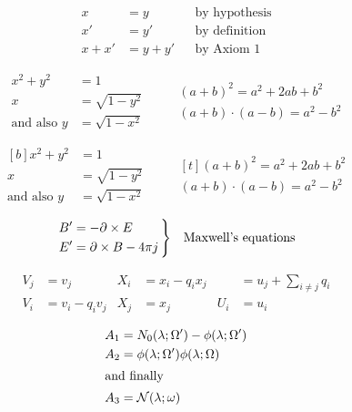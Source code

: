 \documentclass{article}
\begin{document}
\renewcommand\minalignsep{2em}  
\begin{align}  
  x      &= y      && \text{by hypothesis} \\  
      x' &= y'     && \text{by definition} \\  
  x + x' &= y + y' && \text{by Axiom 1}  
\end{align}  
  
\begin{equation}  
\begin{aligned}  
  x^2 + y^2  &= 1               \\  
  x          &= \sqrt{1-y^2}    \\  
 \text{and also }y &= \sqrt{1-x^2}  
\end{aligned}               \qquad  
\begin{gathered}  
 (a + b)^2 = a^2 + 2ab + b^2    \\  
 (a + b) \cdot (a - b) = a^2 - b^2  
\end{gathered}      \end{equation}  
  
\begin{equation}  
\begin{aligned}[b]  
  x^2 + y^2  &= 1               \\  
  x          &= \sqrt{1-y^2}    \\  
 \text{and also }y &= \sqrt{1-x^2}  
\end{aligned}               \qquad  
\begin{gathered}[t]  
 (a + b)^2 = a^2 + 2ab + b^2    \\  
 (a + b) \cdot (a - b) = a^2 - b^2  
\end{gathered}  
\end{equation}  
\newenvironment{rcase}  
    {\left.\begin{aligned}}  
    {\end{aligned}\right\rbrace}  
  
\begin{equation*}  
  \begin{rcase}  
    B' &= -\partial\times E          \\  
    E' &=  \partial\times B - 4\pi j \,  
  \end{rcase}  
  \quad \text {Maxwell's equations}  
\end{equation*}  
  
\begin{equation} \begin{aligned}  
  V_j &= v_j                      &  
  X_i &= x_i - q_i x_j            &  
      &= u_j + \sum_{i\ne j} q_i \\  
  V_i &= v_i - q_i v_j            &  
  X_j &= x_j                      &  
  U_i &= u_i  
\end{aligned} \end{equation}  
  
\begin{align}  
  A_1 &= N_0 (\lambda ; \Omega')  
         -  \phi ( \lambda ; \Omega')   \\  
  A_2 &= \phi (\lambda ; \Omega')  
            \phi (\lambda ; \Omega)     \\  
\intertext{and finally}  
  A_3 &= \mathcal{N} (\lambda ; \omega)  
\end{align}  
\end{document}
